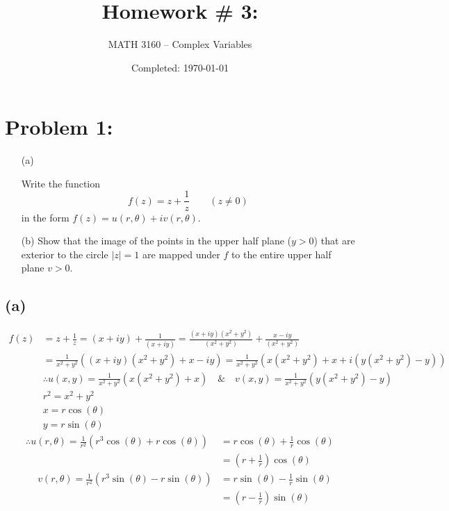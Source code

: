 \documentclass{article}
\title{Homework \# 3: }
\author{
	MATH 3160 -- Complex Variables\\
	\myauthor
}
\date{Completed: \today}
\begin{document}
\maketitle %


\section*{Problem 1: }
\begin{enumerate}
	\item  [(a)]


	      Write the function
	      \[
		      f(z)=z+\frac{1}{z}\qquad (z\neq 0)
	      \]
	      in the form $f(z)=u(r,\theta)+iv(r,\theta)$.

	\item [(b)] Show that the image of the points in the upper half plane ($y>0$) that are exterior to the circle $|z|=1$ are mapped under $f$ to the entire upper half plane $v>0$.
\end{enumerate}

\subsection*{(a)}
\begin{align*}
  f(z)&=z+\frac{1}{z} =  (x+iy)+\frac{1}{(x+iy)}  = \frac{(x+iy)(x^2+y^2)}{(x^2+y^2)} + \frac{x-iy}{(x^2+y^2)}\\
      &= \frac{1}{x^2+y^2}((x+iy)(x^2+y^2) + x-iy) = \frac{1}{x^2+y^2}(x(x^2+y^2) + x + i(y(x^2+y^2) - y))\\
      & \therefore u(x,y) = \frac{1}{x^2+y^2}(x(x^2+y^2) + x)\quad \& \quad v(x,y) = \frac{1}{x^2+y^2}(y(x^2+y^2) - y)\\
      & r^2 = x^2 + y^2\\
      & x = r\cos{(\theta)}\\
      & y = r\sin{(\theta)}
\end{align*}
\begin{align*}
  \therefore u(r,\theta) = \frac{1}{r^2}(r^3\cos{(\theta)} + r\cos{(\theta)}) &= r\cos{(\theta)} + \frac{1}{r}\cos{(\theta)}\\
                                                                              &= \boxed{\left(r + \frac{1}{r}\right)\cos{(\theta)}}\\
  \quad \ v(r,\theta) = \frac{1}{r^2}(r^3\sin{(\theta)} - r\sin{(\theta)}) &= r\sin{(\theta)} - \frac{1}{r}\sin{(\theta)}\\
                                                                              &= \boxed{\left(r - \frac{1}{r}\right)\sin{(\theta)}}
\end{align*}
\end{document}
